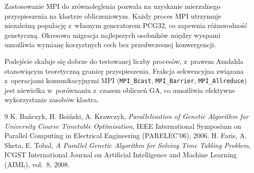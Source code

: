 \documentclass[12pt,a4paper]{article}
\begin{document}
Zastosowanie MPI do zr\'{o}wnoleglenia pozwala na uzyskanie mierzalnego przyspieszenia na klastrze obliczeniowym. Ka\.{z}dy proces MPI utrzymuje niezale\.{z}n\k{a} populacj\k{e} z~w\l{}asnym generatorem PCG32, co zapewnia r\'{o}\.{z}norodno\'{s}\'{c} genetyczn\k{a}. Okresowa migracja najlepszych osobnik\'{o}w mi\k{e}dzy wyspami umo\.{z}liwia wymian\k{e} korzystnych cech bez przedwczesnej konwergencji.

Podej\'{s}cie skaluje si\k{e} dobrze do testowanej liczby proces\'{o}w, z~prawem Amdahla stanowi\k{a}cym teoretyczn\k{a} granic\k{e} przyspieszenia. Frakcja sekwencyjna zwi\k{a}zana z~operacjami komunikacyjnymi MPI (\texttt{MPI\_Bcast}, \texttt{MPI\_Barrier}, \texttt{MPI\_Allreduce}) jest niewielka w~por\'{o}wnaniu z~czasem oblicze\'{n} GA, co umo\.{z}liwia efektywne wykorzystanie zasob\'{o}w klastra.

\begin{thebibliography}{9}
 K. Ba\'{n}czyk, H. Boi\'{n}ski, A. Krawczyk, \textit{Parallelisation of Genetic Algorithm for University Course Timetable Optimisation}, IEEE International Symposium on Parallel Computing in Electrical Engineering (PARELEC'06), 2006.
 H. Faris, A. Sheta, E. Tobal, \textit{A Parallel Genetic Algorithm for Solving Time Tabling Problem}, ICGST International Journal on Artificial Intelligence and Machine Learning (AIML), vol.~8, 2008.
\end{thebibliography}
\end{document}
